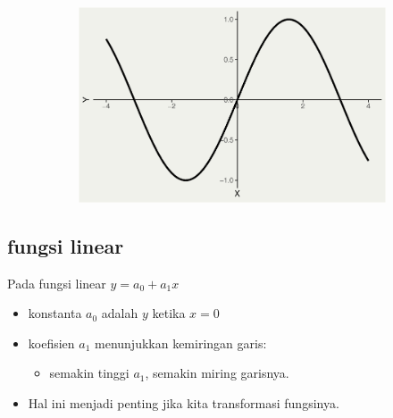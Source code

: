 \documentclass[
  letterpaper,
  DIV=11,
  numbers=noendperiod]{scrartcl}
\providecommand{\tightlist}{%
  \setlength{\itemsep}{0pt}\setlength{\parskip}{0pt}}\usepackage{longtable,booktabs,array}
\begin{document}
\begin{figure}
\begin{minipage}{0.33\linewidth}
\end{minipage}%
%
\begin{minipage}{0.33\linewidth}

\begin{figure}[H]

{\centering \includegraphics{index_files/figure-pdf/unnamed-chunk-5-6.pdf}

}


\end{figure}%

\end{minipage}%

\end{figure}%

\subsection{fungsi linear}\label{fungsi-linear-1}

Pada fungsi linear \(y=a_0+a_1x\)

\begin{itemize}
\item
  konstanta \(a_0\) adalah \(y\) ketika \(x=0\)
\item
  koefisien \(a_1\) menunjukkan kemiringan garis:

  \begin{itemize}
  \tightlist
  \item
    semakin tinggi \(a_1\), semakin miring garisnya.
  \end{itemize}
\item
  Hal ini menjadi penting jika kita transformasi fungsinya.
\end{itemize}
\end{document}
